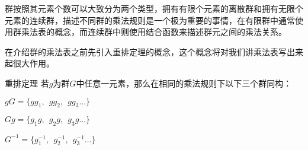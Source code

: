 

群按照其元素个数可以大致分为两个类型，拥有有限个元素的离散群和拥有无限个元素的连续群，描述不同群的乘法规则是一个极为重要的事情，在有限群中通常使用群乘法表的概念，而连续群中则使用结合函数来描述群元之间的乘法关系。

在介绍群的乘法表之前先引入重排定理的概念，这个概念将对我们讲乘法表写出来起很大作用。

\begin{theorem}{重排定理}
若$g$为群$G$中任意一元素，那么在相同的乘法规则下以下三个群同构：

$gG=\{gg_1,~~gg_2,~~gg_3...\}$

$Gg=\{g_1g,~~g_2g,~~g_3g...\}$

$G^{-1}=\{g_1^{-1},~~g_2^{-1},~~g_3^{-1}...\}$
\end{theorem}